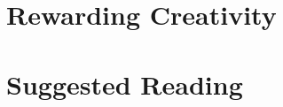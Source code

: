 \documentclass[twocolumn]{dndbook}
\begin{document}







\chapter{Rewarding Creativity}









\chapter*{Suggested Reading}


\cite{Fishel2023} %


\printbibliography[heading=none]
\end{document}
